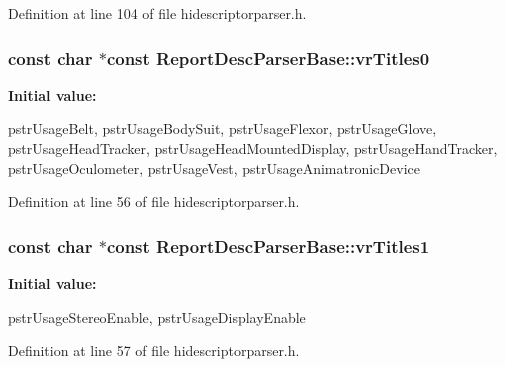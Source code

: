 \-Definition at line 104 of file hidescriptorparser.\-h.

\hypertarget{class_report_desc_parser_base_a42d34a0a49f987c9dcfdd4fb8d42bf0d}{
\subsubsection[{vr\-Titles0}]{\setlength{\rightskip}{0pt plus 5cm}const char $\ast$const {\bf \-Report\-Desc\-Parser\-Base\-::vr\-Titles0}}}\label{class_report_desc_parser_base_a42d34a0a49f987c9dcfdd4fb8d42bf0d}
{\bfseries \-Initial value\-:}
\begin{DoxyCode}
 {
        pstrUsageBelt,
        pstrUsageBodySuit,
        pstrUsageFlexor,
        pstrUsageGlove,
        pstrUsageHeadTracker,
        pstrUsageHeadMountedDisplay,
        pstrUsageHandTracker,
        pstrUsageOculometer,
        pstrUsageVest,
        pstrUsageAnimatronicDevice
}
\end{DoxyCode}


\-Definition at line 56 of file hidescriptorparser.\-h.

\hypertarget{class_report_desc_parser_base_a41af57cb0fb0bbed7277bcd04a9e9fe9}{
\subsubsection[{vr\-Titles1}]{\setlength{\rightskip}{0pt plus 5cm}const char $\ast$const {\bf \-Report\-Desc\-Parser\-Base\-::vr\-Titles1}}}\label{class_report_desc_parser_base_a41af57cb0fb0bbed7277bcd04a9e9fe9}
{\bfseries \-Initial value\-:}
\begin{DoxyCode}
 {
        pstrUsageStereoEnable,
        pstrUsageDisplayEnable
}
\end{DoxyCode}


\-Definition at line 57 of file hidescriptorparser.\-h.




